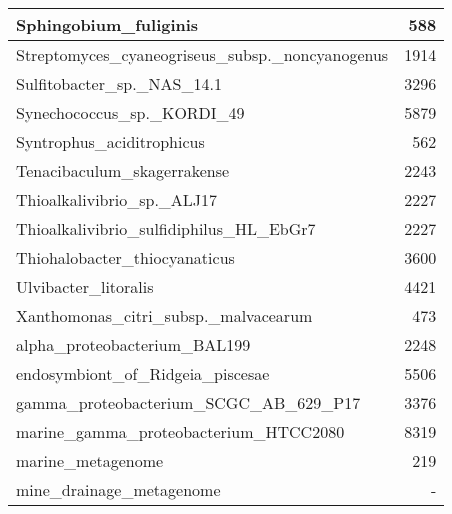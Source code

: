 \documentclass[12pt,a4paper]{article}
\begin{document}
\begin{table}[ht]
\begin{center}
\begin{tabular}{|l*{1}{|r}|}
Sphingobium\_fuliginis & 588 \\ \hline
Streptomyces\_cyaneogriseus\_subsp.\_noncyanogenus & 1914 \\ \hline
Sulfitobacter\_sp.\_NAS\_14.1 & 3296 \\ \hline
Synechococcus\_sp.\_KORDI\_49 & 5879 \\ \hline
Syntrophus\_aciditrophicus & 562 \\ \hline
Tenacibaculum\_skagerrakense & 2243 \\ \hline
Thioalkalivibrio\_sp.\_ALJ17 & 2227 \\ \hline
Thioalkalivibrio\_sulfidiphilus\_HL\_EbGr7 & 2227 \\ \hline
Thiohalobacter\_thiocyanaticus & 3600 \\ \hline
Ulvibacter\_litoralis & 4421 \\ \hline
Xanthomonas\_citri\_subsp.\_malvacearum & 473 \\ \hline
alpha\_proteobacterium\_BAL199 & 2248 \\ \hline
endosymbiont\_of\_Ridgeia\_piscesae & 5506 \\ \hline
gamma\_proteobacterium\_SCGC\_AB\_629\_P17 & 3376 \\ \hline
marine\_gamma\_proteobacterium\_HTCC2080 & 8319 \\ \hline
marine\_metagenome & 219 \\ \hline
mine\_drainage\_metagenome & - \\ \hline
\end{tabular}
\end{center}
\end{table}
\end{document}
